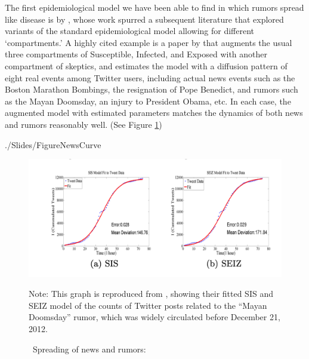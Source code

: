 The first epidemiological model we have been able to find in which rumors spread like disease is by \cite{daley1964epidemics},  whose work spurred a subsequent literature that explored variants of the standard epidemiological model allowing for different `compartments.'  A highly cited example is a paper by \cite{jin2013epidemiological} that augments the usual three compartments of Susceptible, Infected, and Exposed with another compartment of skeptics, and estimates the model with a diffusion pattern of eight real events among Twitter users, including actual news events such as the Boston Marathon Bombings, the resignation of Pope Benedict, and rumors such as the Mayan Doomsday, an injury to President Obama, etc.  In each case, the augmented model with estimated parameters matches the dynamics of both news and rumors reasonably well. (See Figure \ref{fig:news_curve})






\begin{verbatimwrite}{./Slides/FigureNewsCurve}
	\begin{figure}[!ht] \centering  %
		\caption{ ~Spreading of news and rumors: \href{https://people.cs.vt.edu/ramakris/papers/news-rumor-epi-snakdd13.pdf}{\cite{jin2013epidemiological}}}
		\label{fig:news_curve}
		\centerline{\includegraphics[width=\textwidth]{./figures/Doomsday.png}}
		\begin{flushleft}{\footnotesize Note: This graph is reproduced from \cite{jin2013epidemiological}, showing their fitted SIS and SEIZ model of the counts of Twitter posts related to the ``Mayan Doomsday'' rumor, which was widely circulated before December 21, 2012.}
		\end{flushleft}
	\end{figure}
\end{verbatimwrite}%

